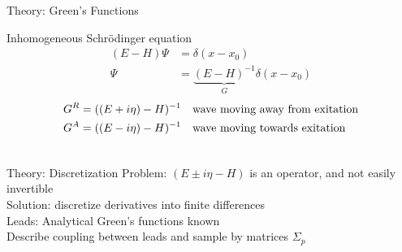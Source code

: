 \documentclass{beamer}
\begin{document}
%
%

\begin{frame}{Theory: Green's Functions}
    \begin{center}
        Inhomogeneous Schrödinger equation
        \begin{align*}
            (E-H) \Psi &= \delta(x-x_0)\\
            \Psi       &= \underbrace{(E-H)^{-1}}_{G} \delta(x-x_0)
        \end{align*}
        \pause
        \begin{align*}
            G^R = ((E + i \eta) -H)^{-1}\quad & \textnormal{wave moving away from exitation}\\
            G^A = ((E - i \eta) -H)^{-1}\quad & \textnormal{wave moving
            towards exitation}
        \end{align*}

        \begin{align*}
        \end{align*}
   \end{center}
\end{frame}

\begin{frame}{Theory: Discretization}
    Problem: $(E\pm i\eta-H)$ is an operator, and not easily invertible\\[1em]

    \pause
    Solution: discretize derivatives into finite differences\\[1em]

    \pause
    Leads: Analytical Green's functions known\\[1em]

    \pause
    Describe coupling between leads and sample by matrices $\Sigma_p$
\end{frame}
\end{document}
